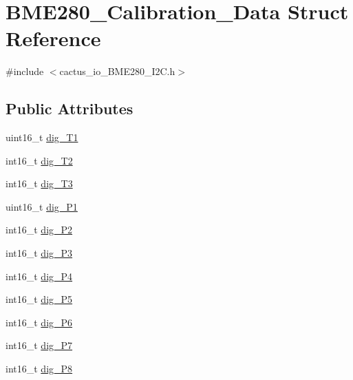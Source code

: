\hypertarget{struct_b_m_e280___calibration___data}{}\section{B\+M\+E280\+\_\+\+Calibration\+\_\+\+Data Struct Reference}
\label{struct_b_m_e280___calibration___data}


{\ttfamily \#include $<$cactus\+\_\+io\+\_\+\+B\+M\+E280\+\_\+\+I2\+C.\+h$>$}

\subsection*{Public Attributes}
\begin{DoxyCompactItemize}
\item 
uint16\+\_\+t \hyperlink{struct_b_m_e280___calibration___data_a7d290437dcc12f1586e3c68b014428f4}{dig\+\_\+\+T1}
\item 
int16\+\_\+t \hyperlink{struct_b_m_e280___calibration___data_a53b99ea88fe2832b5bf4c58e9a377306}{dig\+\_\+\+T2}
\item 
int16\+\_\+t \hyperlink{struct_b_m_e280___calibration___data_a88361715e2dd7b138bac282729dd6fd6}{dig\+\_\+\+T3}
\item 
uint16\+\_\+t \hyperlink{struct_b_m_e280___calibration___data_afc266f6d206c09b4b0242d52b098b84c}{dig\+\_\+\+P1}
\item 
int16\+\_\+t \hyperlink{struct_b_m_e280___calibration___data_afe00e1a709438b94e0722c9794aae3f2}{dig\+\_\+\+P2}
\item 
int16\+\_\+t \hyperlink{struct_b_m_e280___calibration___data_a6a04c549589c86a8f714214d08890bf9}{dig\+\_\+\+P3}
\item 
int16\+\_\+t \hyperlink{struct_b_m_e280___calibration___data_ae6d9c88bc789b38af6db9e1a07fecf5a}{dig\+\_\+\+P4}
\item 
int16\+\_\+t \hyperlink{struct_b_m_e280___calibration___data_a192cfcc8c79e07ec2eac7fb336d2c1a9}{dig\+\_\+\+P5}
\item 
int16\+\_\+t \hyperlink{struct_b_m_e280___calibration___data_a9054f5ae29d5dc2ab08590abcafe1ee0}{dig\+\_\+\+P6}
\item 
int16\+\_\+t \hyperlink{struct_b_m_e280___calibration___data_a522c0b4bacbe23f19c5a81facf383df5}{dig\+\_\+\+P7}
\item 
int16\+\_\+t \hyperlink{struct_b_m_e280___calibration___data_a277f86eb7bc1ed109397bbc5b696d122}{dig\+\_\+\+P8}
\item 

\end{DoxyCompactItemize}
